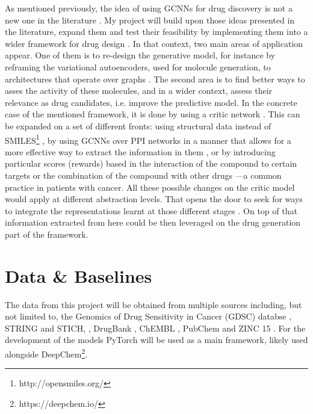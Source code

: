 \documentclass{article}
\begin{document}
As mentioned previously, the idea of using GCNNs for drug discovery is not a new one in
 the literature \cite{Sun2019}. My project will build upon those ideas presented in the
 literature, expand them and test their feasibility by implementing them into a wider
 framework for drug design \cite{Born2019}. In that context, two main areas of
 application appear. One of them is to re-design the generative model, for instance by
 reframing the variational autoencoders, used for molecule generation, to architectures
 that operate over graphs \cite{Simonovsky2018,Li2018, Li2018a}. The second area is to
 find better ways to asses the activity of these molecules, and in a wider context,
 assess their relevance as drug candidates, i.e. improve the predictive model. In the
 concrete case of the mentioned framework, it is done by using a critic network
 \cite{Manica2019}. This can be expanded on a set of different fronts: using structural
 data instead of SMILES\footnote{http://opensmiles.org/} \cite{Li, Do2019}, {\color{red}
 by using GCNNs over PPI networks in a manner that allows for a more effective way to
 extract the information in them} \cite{Oskooei2019, Wang2019}, or by introducing
 particular scores (rewards) based in the interaction of the compound to certain targets
 \cite{YingkaiGao2018, Zhavoronkov2019} or the combination of the compound with other
 drugs \cite{Zitnik2018}---a common practice in patients with cancer. All these possible
 changes on the critic model would apply at different abstraction levels. That opens the
 door to seek for ways to integrate the representations learnt at those different stages
 \cite{Ying2018, Ma2019, Huang2019}. On top of that information extracted from here
 could be then leveraged on the drug generation part of the framework.


    \section*{Data \& Baselines}

The data from this project will be obtained from multiple sources including, but not
 limited to, the Genomics of Drug Sensitivity in Cancer (GDSC) databse \cite{Yang2013},
 STRING and STICH, \cite{Szklarczyk2019,Szklarczyk2016}, DrugBank \cite{Wishart2006},
 ChEMBL \cite{Gaulton2017}, PubChem \cite{Kim2019} and ZINC 15 \cite{Sterling2015}. For
 the development of the models PyTorch \cite{Paszke2019} will be used as a main
 framework, likely used alongside DeepChem\footnote{https://deepchem.io/}.
\end{document}

